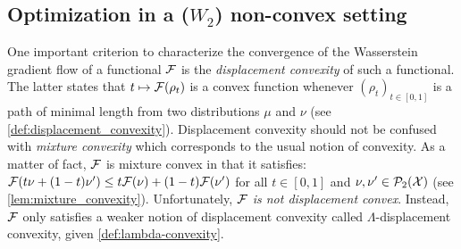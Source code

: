 


\subsection{Optimization in a ($W_2$) non-convex setting}
\label{subsection:barrier_optimization}
One important criterion to characterize the convergence of the Wasserstein gradient flow of a functional ${{\mathcal F}}$ is the \textit{displacement convexity} of such a functional. The latter states that $t\mapsto {{\mathcal F}}(\rho_t)$ is a convex function whenever $(\rho_t)_{t\in[0,1]}$ is a path of minimal length from two distributions $\mu$ and $\nu$ (see \cref{def:displacement_convexity}). %
Displacement convexity should not be confused with \textit{mixture convexity} which corresponds to the usual notion of convexity. As a matter of fact, ${{\mathcal F}}$ is mixture convex in that it satisfies: ${{\mathcal F}}(t\nu +(1-t)\nu')\leq t{{\mathcal F}}(\nu)+(1-t){{\mathcal F}}(\nu')$ for all $t\in [0,1]$ and $\nu,\nu'\in\mathcal{P}_2({{\mathcal X}})$ (see \cref{lem:mixture_convexity}). Unfortunately, \textit{${{\mathcal F}}$ is not displacement convex}. Instead, ${{\mathcal F}}$ only satisfies a weaker notion of displacement convexity called $\Lambda$-displacement convexity, given \cref{def:lambda-convexity}. 
